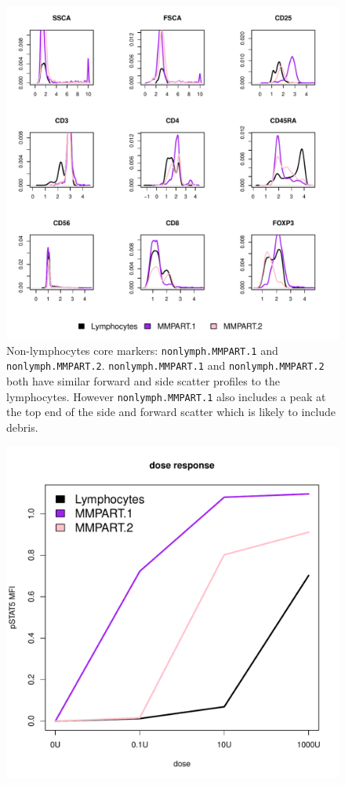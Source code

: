 %
\begin{figure}
\centering
\begin{minipage}{.9\textwidth}
\includegraphics[width=\linewidth]{figures/mmpart-nonlymphocytes-clusters}
{Non-lymphocytes core markers: \texttt{nonlymph.MMPART.1} and \texttt{nonlymph.MMPART.2}. }
{
\texttt{nonlymph.MMPART.1} and \texttt{nonlymph.MMPART.2} both have similar forward and side scatter profiles to the lymphocytes.
However \texttt{nonlymph.MMPART.1} also includes a peak at the top end of the side and forward scatter which is likely to include debris.
}
\end{minipage}
%
\begin{minipage}{.5\textwidth}
  \includegraphics[width=\linewidth]{figures/mmpart-nonlymphocytes-dose-response}

\end{minipage}
\end{figure}
